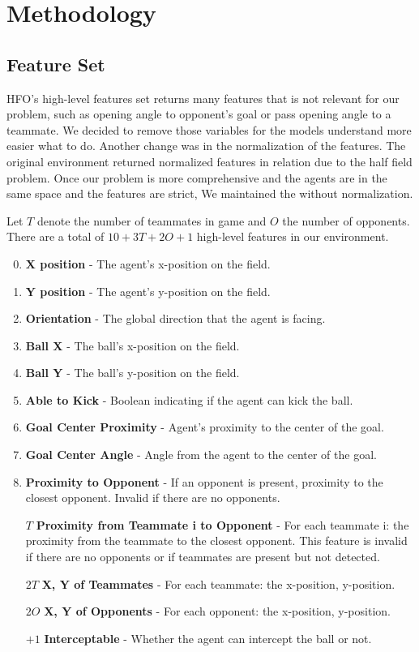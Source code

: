 \chapter{Methodology}
\section{Feature Set}
HFO's high-level features set returns many features that is not relevant for our problem, such as opening angle to opponent's goal or pass opening angle to a teammate. We decided to remove those variables for the models understand more easier what to do. Another change was in the normalization of the features. The original environment returned normalized features in relation due to the half field problem. Once our problem is more comprehensive and the agents are in the same space and the features are strict, We maintained the without normalization. 

Let $T$ denote the number of teammates in game and $O$ the
number of opponents. There are a total of $10 + 3T + 2O + 1$ high-level
features in our environment.

\begin{enumerate}[noitemsep]
\setcounter{enumi}{-1}
\item{\textbf{X position} - The agent’s x-position on the field.}
\item{\textbf{Y position} - The agent’s y-position on the field.}
\item{\textbf{Orientation} - The global direction that the agent is facing.}
\item{\textbf{Ball X} - The ball's x-position on the field.}
\item{\textbf{Ball Y} - The ball's y-position on the field.}
\item{\textbf{Able to Kick} - Boolean indicating if the agent can kick the ball.}
\item{\textbf{Goal Center Proximity} - Agent's proximity to the center of the goal.}
\item{\textbf{Goal Center Angle} - Angle from the agent to the center of the goal.}
\item{\textbf{Proximity to Opponent} - If an opponent is present,
  proximity to the closest opponent. Invalid if there are no
  opponents.}
\item [$T$] {\textbf{Proximity from Teammate i to Opponent} - For each
  teammate i: the proximity from the teammate to the closest
  opponent. This feature is invalid if there are no opponents or if
  teammates are present but not detected.}
\item [$2T$] {\textbf{X, Y of Teammates} - For each teammate: the x-position, y-position.}
\item [$2O$] {\textbf{X, Y of Opponents} - For each opponent: the x-position, y-position.}
\item [$+1$] {\textbf{Interceptable} - Whether the agent can intercept the ball or
 not.}
\end{enumerate}

